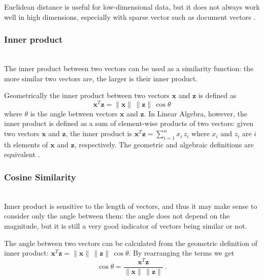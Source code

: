 Euclidean distance is useful for low-dimensional data,
but it does not always work well in high dimensions, especially
with sparse vector such as document vectors \cite{ertoz2003finding}.



\subsubsection{Inner product} \ \\

The inner product between two vectors can be used as a similarity function:
the more similar two vectors are, the larger is their inner product.

Geometrically the inner product between two vectors $\mathbf x$ and $\mathbf z$
is defined as
$$\mathbf x^T \mathbf z = \|\mathbf x \| \, \| \mathbf z \| \, \cos \theta$$
where $\theta$ is the angle between vectors $\mathbf x$ and $\mathbf z$.
In Linear Algebra, however, the inner product
is defined as a sum of element-wise products of two vectors:
given two vectors $\mathbf x$ and $\mathbf z$, the inner product is
$\mathbf x^T \mathbf z = \sum_{i = 1}^n x_i \, z_i$ where $x_i$ and $z_i$
are $i$th elements of $\mathbf x$ and $\mathbf z$, respectively.
The geometric and algebraic definitions are equivalent \cite{huges2013calculus}.



\subsubsection{Cosine Similarity} \ \\




Inner product is sensitive to the length of vectors, and thus
it may make sense to consider only the angle between them: 
the angle does not depend on the magnitude, but it is still
a very good indicator of vectors being similar or not.

The angle between two vectors can be calculated from the geometric
definition of inner product:
$\mathbf x^T \mathbf z = \|\mathbf x \| \, \| \mathbf z \| \, \cos \theta$.
By rearranging the terms we get
$$\cos \theta = \frac{\mathbf x^T \mathbf z}{\|\mathbf x \| \, \| \mathbf z \|} \ .$$ 

